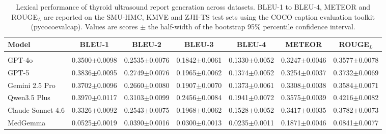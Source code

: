 \begin{table}[p]
\centering
\begin{threeparttable}

\caption{Lexical performance of thyroid ultrasound report generation across datasets. BLEU-1 to BLEU-4, METEOR and ROUGE$_L$ are reported on the SMU-HMC, KMVE and ZJH-TS test sets using the COCO caption evaluation toolkit (pycocoevalcap). Values are scores $\pm$ the half-width of the bootstrap 95\% percentile confidence interval.}
\label{tab:report_generation_nlg_ci}

\footnotesize
\setlength{\tabcolsep}{5.2pt}
\renewcommand{\arraystretch}{1.04}

\begin{tabular}{lcccccc}
\toprule
\textbf{Model}
& \textbf{BLEU-1}
& \textbf{BLEU-2}
& \textbf{BLEU-3}
& \textbf{BLEU-4}
& \textbf{METEOR}
& \textbf{ROUGE$_L$} \\
\midrule

\rowcolor{gray!20}
\multicolumn{7}{c}{\textbf{SMU-HMC Testset} ($n=400$)} \\

GPT-4o~\cite{openai_gpt4_2024}
& 0.3500$\pm$0.0098
& 0.2535$\pm$0.0076
& 0.1842$\pm$0.0061
& 0.1330$\pm$0.0052
& 0.3247$\pm$0.0046
& 0.3577$\pm$0.0078 \\

GPT-5~\cite{openai2025gpt5systemcard}
& 0.3836$\pm$0.0095
& 0.2749$\pm$0.0076
& 0.1965$\pm$0.0062
& 0.1374$\pm$0.0052
& 0.3254$\pm$0.0037
& 0.3732$\pm$0.0069 \\

Gemini 2.5 Pro~\cite{comanici_gemini_2025}
& 0.3702$\pm$0.0096
& 0.2660$\pm$0.0080
& 0.1907$\pm$0.0070
& 0.1373$\pm$0.0061
& 0.3308$\pm$0.0038
& 0.3584$\pm$0.0071 \\

Qwen3.5 Plus~\cite{yang_qwen3_2025}
& 0.3970$\pm$0.0117
& 0.3103$\pm$0.0099
& 0.2456$\pm$0.0084
& 0.1941$\pm$0.0072
& 0.3575$\pm$0.0039
& 0.4216$\pm$0.0082 \\

Claude Sonnet 4.6
& 0.3326$\pm$0.0092
& 0.2543$\pm$0.0075
& 0.1968$\pm$0.0062
& 0.1528$\pm$0.0052
& 0.3417$\pm$0.0035
& 0.3782$\pm$0.0073 \\

MedGemma~\cite{sellergren2025medgemma}
& 0.0525$\pm$0.0019
& 0.0390$\pm$0.0016
& 0.0300$\pm$0.0013
& 0.0235$\pm$0.0011
& 0.1871$\pm$0.0046
& 0.0841$\pm$0.0077 \\


\end{tabular}
\end{threeparttable}
\end{table}
